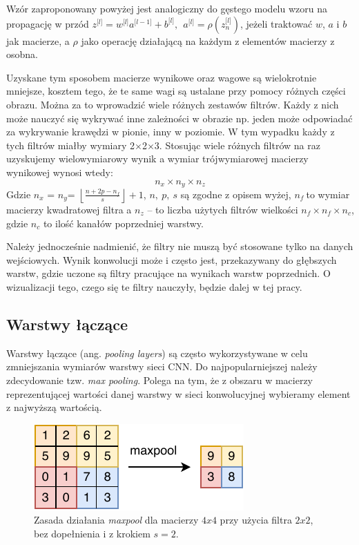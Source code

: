Wzór zaproponowany powyżej jest analogiczny do gęstego modelu wzoru na
propagację w przód \(z^{\lbrack l\rbrack} = w^{\lbrack l\rbrack}a^{\lbrack l - 1\rbrack} + b^{\lbrack l\rbrack},\ \ a^{\lbrack l\rbrack} = \rho(z_{n}^{\lbrack l\rbrack})\), jeżeli traktować \(w\), \(a\) i \(b\) jak macierze, a \(\rho\) jako operację działającą na każdym z elementów macierzy z osobna.

Uzyskane tym sposobem macierze wynikowe oraz wagowe są wielokrotnie mniejsze, kosztem tego, że te same wagi są ustalane przy pomocy różnych części obrazu. Można za to wprowadzić wiele różnych zestawów filtrów. Każdy z nich może nauczyć się wykrywać inne zależności w obrazie np. jeden może odpowiadać za wykrywanie krawędzi w pionie, inny w poziomie. W tym wypadku każdy z tych filtrów miałby wymiary 2\(\times\)2\(\times\)3. Stosując wiele różnych filtrów na raz uzyskujemy wielowymiarowy wynik
a wymiar trójwymiarowej macierzy wynikowej wynosi wtedy:
\[n_{x} \times n_{y} \times n_{z}\]
Gdzie \(n_{x}\) = ­­\(n_{y}\)=
\(\left\lfloor \frac{n + 2p - n_{f}}{s} \right\rfloor + 1\), \(n,\ p,\ s\)
są zgodne z opisem wyżej, \(n_{f}\ \)to wymiar macierzy kwadratowej
filtra a \(n_{z}\) -- to liczba użytych filtrów wielkości
\(n_{f} \times n_{f} \times n_{c}\), gdzie \(n_{c}\) to ilość kanałów poprzedniej warstwy.

Należy jednocześnie nadmienić, że filtry nie muszą być stosowane tylko na danych wejściowych. Wynik konwolucji może i często jest, przekazywany do głębszych warstw, gdzie uczone są filtry pracujące na wynikach warstw poprzednich. O wizualizacji tego, czego się te filtry nauczyły, będzie dalej w tej pracy.

\subsection{Warstwy łączące}

Warstwy łączące (ang. \textit{pooling layers}) są często wykorzystywane w celu zmniejszania wymiarów warstwy sieci CNN. Do najpopularniejszej należy zdecydowanie tzw. \textit{max pooling}. Polega na tym, że z obszaru w macierzy reprezentującej wartości danej warstwy w sieci konwolucyjnej wybieramy element z najwyższą wartością.

\begin{figure}[ht]
\centerline{\includegraphics[scale=1]{resources/cnn/maxpool.pdf}}
\caption{Zasada działania \textit{maxpool} dla macierzy \(4x4\) przy użycia filtra \(2x2\), bez dopełnienia i z krokiem \(s = 2\).}
\label{fig:maxpool}
\end{figure}

